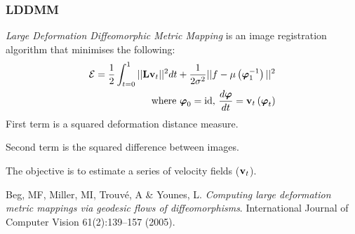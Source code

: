 \begin{frame}
\frametitle{LDDMM}
\emph{Large Deformation Diffeomorphic Metric Mapping} is an image registration algorithm that minimises the following:
\begin{eqnarray*}
\mathcal{E}  =   \frac{1}{2} \int_{t=0}^1  || {\bf L} {\bf v}_t ||^2 dt +
                 \frac{1}{2\sigma^2} || f - \mu\left({\boldsymbol\varphi}_1^{-1}\right)||^2\\
\text{  where } {\boldsymbol\varphi}_0 = \mathrm{id} \text{, } \frac{d{\boldsymbol\varphi}}{dt} = {\bf v}_t\left({\boldsymbol\varphi}_t\right)
\end{eqnarray*}
First term is a squared deformation distance measure.\par
Second term is the squared difference between images.\par
The objective is to estimate a series of velocity fields (${\bf v}_t$).\par
\vspace{.25cm}
\begin{tiny}
Beg, MF, Miller, MI, Trouv{\'e}, A \& Younes, L. \emph{Computing large deformation metric mappings via geodesic flows of diffeomorphisms}. International Journal of Computer Vision 61(2):139--157 (2005).\par
\end{tiny}
\end{frame}






